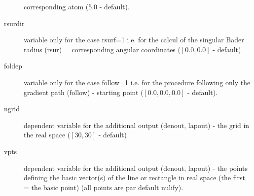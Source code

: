 \documentclass[11pt]{article}
\begin{document}
\begin{description}
corresponding atom (5.0 - default).
\item [rsurdir] variable only for the case rsurf=1 i.e. for the
  calcul of the singular Bader radius (rsur) = corresponding 
  angular coordinates ($[0.0,0.0]$ - default).
\item [foldep] variable only for the case follow=1 i.e. for the 
procedure following only the gradient path (follow) - starting point 
($[0.0,0.0,0.0]$ - default).
\item [ngrid] dependent variable for the additional output
(denout, lapout) - the grid in the real space ($[30,30]$ - default)
\item [vpts] dependent variable for the additional output
(denout, lapout) - the points defining the basic vector(s) of the line
or rectangle in real space (the first = the basic point)
(all points are par default nulify).
\end{description}
\end{document}
